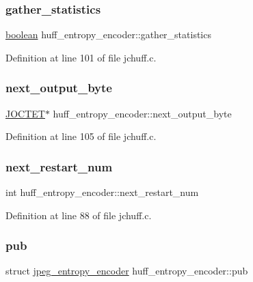 \subsubsection{\texorpdfstring{gather\_statistics}{gather\_statistics}}
{\footnotesize\ttfamily \mbox{\hyperlink{jmorecfg_8h_a7c6368b321bd9acd0149b030bb8275ed}{boolean}} huff\+\_\+entropy\+\_\+encoder\+::gather\+\_\+statistics}



Definition at line 101 of file jchuff.\+c.

\mbox{\label{structhuff__entropy__encoder_ad7be281727ae2a6488c8b37b017c1f40}} 
\subsubsection{\texorpdfstring{next\_output\_byte}{next\_output\_byte}}
{\footnotesize\ttfamily \mbox{\hyperlink{jmorecfg_8h_a356ad249f20e691b520da439f92cccbc}{J\+O\+C\+T\+ET}}$\ast$ huff\+\_\+entropy\+\_\+encoder\+::next\+\_\+output\+\_\+byte}



Definition at line 105 of file jchuff.\+c.

\mbox{\label{structhuff__entropy__encoder_ad6a426b0d41e9d06359bcc57481c891b}} 
\subsubsection{\texorpdfstring{next\_restart\_num}{next\_restart\_num}}
{\footnotesize\ttfamily int huff\+\_\+entropy\+\_\+encoder\+::next\+\_\+restart\+\_\+num}



Definition at line 88 of file jchuff.\+c.

\mbox{\label{structhuff__entropy__encoder_a1a7606509ffbd9efd4c611af433879e0}} 
\subsubsection{\texorpdfstring{pub}{pub}}
{\footnotesize\ttfamily struct \mbox{\hyperlink{structjpeg__entropy__encoder}{jpeg\+\_\+entropy\+\_\+encoder}} huff\+\_\+entropy\+\_\+encoder\+::pub}



